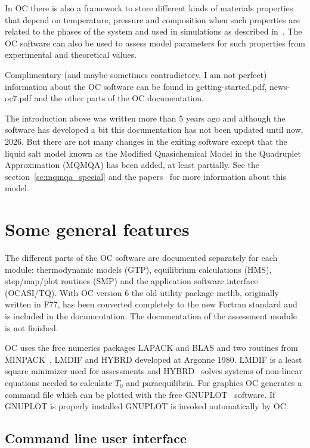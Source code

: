 \documentclass[11pt]{article}
\begin{document}
In OC there is also a framework to store different kinds of materials
properties that depend on temperature, pressure and composition when
such properties are related to the phases of the system and used in
simulations as described in~\cite{20Her}.  The OC software can also be
used to assess model parameters for such properties from experimental
and theoretical values.

Complimentary (and maybe sometimes contradictory, I am not perfect)
information about the OC software can be found in getting-started.pdf,
news-oc7.pdf and the other parts of the OC documentation.

The introduction above was written more than 5 years ago and although
the software has developed a bit this documentation has not been
updated until now, 2026.  But there are not many changes in the
exiting software except that the liquid salt model known as the
Modified Quasichemical Model in the Quadruplet Approximation (MQMQA)
has been added, at least partially.  See the
section~\ref{sc:mqmqa_special} and the papers~\cite{01Pel2,21Max} for
more information about this model.

\section{Some general features}

The different parts of the OC software are documented separately for
each module: thermodynamic models (GTP), equilibrium calculations
(HMS), step/map/plot routines (SMP) and the application software
interface (OCASI/TQ).  With OC version 6 the old utility package
metlib, originally written in F77, has been converted completely to
the new Fortran standard and is included in the documentation.  The
documentation of the assessment module is not finished.

OC uses the free numerics packages LAPACK and BLAS and two routines
from MINPACK~\cite{lmdif}, LMDIF and HYBRD developed at Argonne 1980.
LMDIF is a least square minimizer used for assessments and
HYBRD~\cite{lmdif} solves systems of non-linear equations needed to
calculate $T_0$ and paraequilibria.  For graphics OC generates a
command file which can be plotted with the free GNUPLOT~\cite{gnuplot}
software.  If GNUPLOT is properly installed GNUPLOT is invoked
automatically by OC.

\subsection{Command line user interface}
\end{document}
